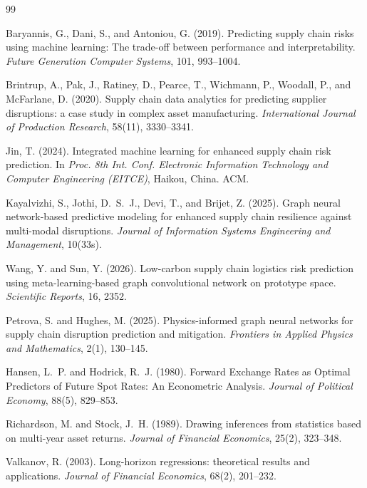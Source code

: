 \documentclass[10pt]{article}
\begin{document}
\clearpage
\begin{thebibliography}{99}

 Baryannis, G., Dani, S., and Antoniou, G. (2019). Predicting supply chain risks using machine learning: The trade-off between performance and interpretability. \emph{Future Generation Computer Systems}, 101, 993--1004.

 Brintrup, A., Pak, J., Ratiney, D., Pearce, T., Wichmann, P., Woodall, P., and McFarlane, D. (2020). Supply chain data analytics for predicting supplier disruptions: a case study in complex asset manufacturing. \emph{International Journal of Production Research}, 58(11), 3330--3341.

 Jin, T. (2024). Integrated machine learning for enhanced supply chain risk prediction. In \emph{Proc. 8th Int. Conf. Electronic Information Technology and Computer Engineering (EITCE)}, Haikou, China. ACM.

 Kayalvizhi, S., Jothi, D.~S.~J., Devi, T., and Brijet, Z. (2025). Graph neural network-based predictive modeling for enhanced supply chain resilience against multi-modal disruptions. \emph{Journal of Information Systems Engineering and Management}, 10(33s).

 Wang, Y. and Sun, Y. (2026). Low-carbon supply chain logistics risk prediction using meta-learning-based graph convolutional network on prototype space. \emph{Scientific Reports}, 16, 2352.

 Petrova, S. and Hughes, M. (2025). Physics-informed graph neural networks for supply chain disruption prediction and mitigation. \emph{Frontiers in Applied Physics and Mathematics}, 2(1), 130--145.

 Hansen, L.~P. and Hodrick, R.~J. (1980). Forward Exchange Rates as Optimal Predictors of Future Spot Rates: An Econometric Analysis. \emph{Journal of Political Economy}, 88(5), 829--853.

 Richardson, M. and Stock, J.~H. (1989). Drawing inferences from statistics based on multi-year asset returns. \emph{Journal of Financial Economics}, 25(2), 323--348.

 Valkanov, R. (2003). Long-horizon regressions: theoretical results and applications. \emph{Journal of Financial Economics}, 68(2), 201--232.


\end{thebibliography}
\end{document}

